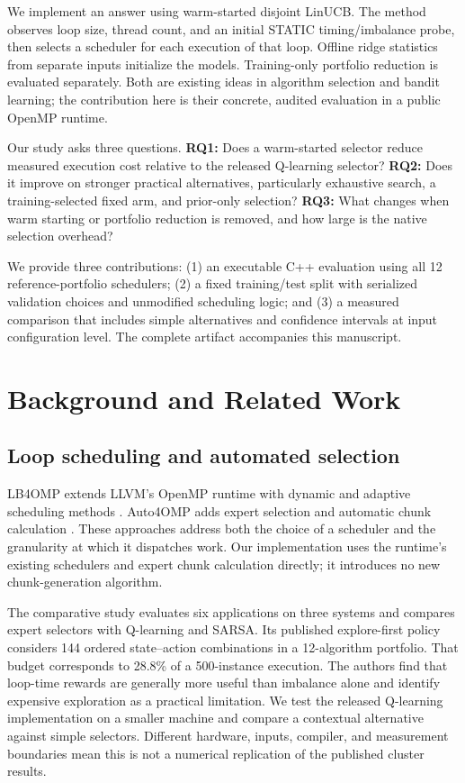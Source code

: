 \documentclass[10pt,letterpaper]{article}
\begin{document}
We implement an answer using warm-started disjoint LinUCB. The method observes
loop size, thread count, and an initial STATIC timing/imbalance probe, then
selects a scheduler for each execution of that loop. Offline ridge statistics
from separate inputs initialize the models. Training-only portfolio reduction
is evaluated separately. Both are existing ideas in algorithm selection and
bandit learning; the contribution here is their concrete, audited evaluation
in a public OpenMP runtime.

Our study asks three questions. \textbf{RQ1:} Does a warm-started selector
reduce measured execution cost relative to the released Q-learning selector?
\textbf{RQ2:} Does it improve on stronger practical alternatives, particularly
exhaustive search, a training-selected fixed arm, and prior-only selection?
\textbf{RQ3:} What changes when warm starting or portfolio reduction is removed,
and how large is the native selection overhead?

We provide three contributions: (1) an executable C++ evaluation using all 12
reference-portfolio schedulers; (2) a fixed training/test split with serialized
validation choices and unmodified scheduling logic; and (3) a measured
comparison that includes simple alternatives and confidence intervals at input
configuration level. The complete artifact accompanies this manuscript.

\section{Background and Related Work}

\subsection{Loop scheduling and automated selection}

LB4OMP extends LLVM's OpenMP runtime with dynamic and adaptive scheduling
methods \cite{lb4omp}. Auto4OMP adds expert selection and automatic chunk
calculation \cite{auto4omp}. These approaches address both the choice of a
scheduler and the granularity at which it dispatches work. Our implementation
uses the runtime's existing schedulers and expert chunk calculation directly;
it introduces no new chunk-generation algorithm.

The comparative study \cite{comparative} evaluates six applications on three
systems and compares expert selectors with Q-learning and SARSA. Its published
explore-first policy considers 144 ordered state--action combinations in a
12-algorithm portfolio. That budget corresponds to 28.8\% of a 500-instance
execution. The authors find that loop-time rewards are generally more useful
than imbalance alone and identify expensive exploration as a practical
limitation. We test the released Q-learning implementation on a smaller
machine and compare a contextual alternative against simple selectors.
Different hardware, inputs, compiler, and measurement boundaries mean this is
not a numerical replication of the published cluster results.
\end{document}
